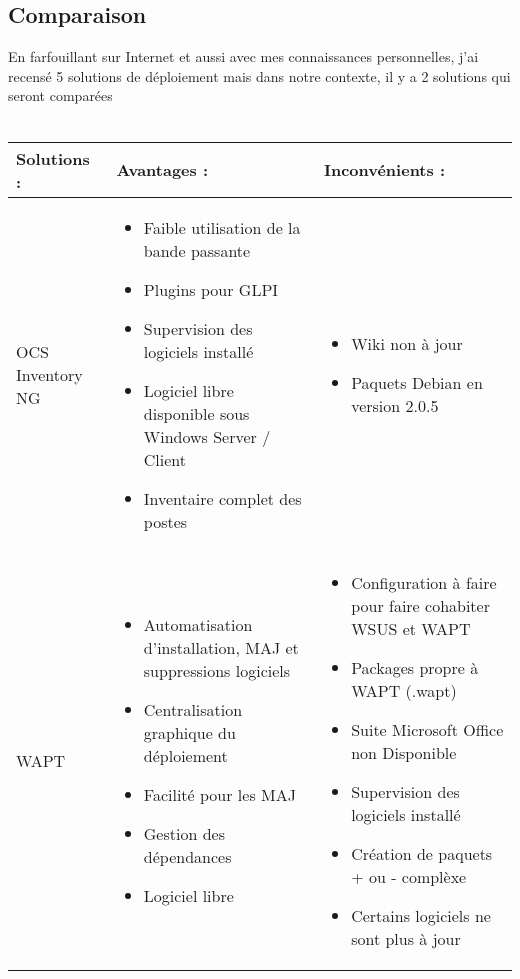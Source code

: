 \documentclass[11pt,a4paper,oneside]{article}
\begin{document}
\subsection{Comparaison}
En farfouillant sur Internet et aussi avec mes connaissances personnelles, j'ai recensé 5 solutions de déploiement mais dans notre contexte, il y a 2 solutions qui seront comparées \\ \\
\begin{tabular}{|p{3.1cm}|p{6.5cm}|p{6.5cm}|}
	\hline
	\centering Solutions : & \centering Avantages : & Inconvénients : \\
	\hline
	\centering OCS Inventory NG  & \begin{itemize}
							\item Faible utilisation de la bande passante 
							\item Plugins pour GLPI							
							\item Supervision des logiciels installé
							\item Logiciel libre disponible sous Windows Server / Client
							\item Inventaire complet des postes							
						\end{itemize} & \begin{itemize}
												\item Wiki non à jour  
												\item Paquets Debian en version 2.0.5																			\end{itemize} \\
	\hline
	\centering WAPT  & \begin{itemize}
							\item Automatisation d'installation, MAJ et suppressions logiciels 
							\item Centralisation graphique du déploiement
							\item Facilité pour les MAJ 
							\item Gestion des dépendances
							\item Logiciel libre													
						\end{itemize} & \begin{itemize}
												\item Configuration à faire pour faire cohabiter WSUS et WAPT 
												\item Packages propre à WAPT (.wapt)
												\item Suite Microsoft Office non Disponible
												\item Supervision des logiciels installé
												\item Création de paquets + ou - complèxe
												\item Certains logiciels ne sont plus à jour			
										\end{itemize} \\
	\hline	
\end{tabular}
\end{document}
